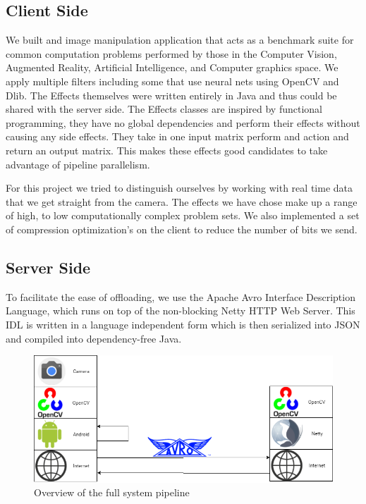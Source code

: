 \documentclass{sig-alternate}
\begin{document}
\subsection{Client Side}
We built and image manipulation application that  acts as a benchmark suite for common computation problems performed by those in the Computer Vision, Augmented Reality, Artificial Intelligence, and Computer graphics space. We apply multiple filters including some that use neural nets using  OpenCV and Dlib. The Effects themselves were written entirely in Java and thus could be shared with the server side. The Effects classes are inspired by functional programming, they have no global dependencies  and perform their effects without causing any side effects. They take in one input matrix perform and action and return an output matrix. This  makes these effects good candidates to take advantage of pipeline parallelism.

For this project we tried to distinguish ourselves by working with real time data that we get straight from the camera. The effects we have chose make up a range of high, to low computationally complex problem sets. We also implemented a set of  compression optimization's on the client to reduce  the number of bits we send.
    
\subsection{Server Side}
To facilitate the ease of offloading, we use the Apache Avro Interface Description Language, which runs on top of the non-blocking Netty HTTP Web Server.  This IDL is written in a language independent form which is then serialized into JSON and compiled into dependency-free Java.

\begin{figure}[h]
\noindent \includegraphics[scale=.3]{ServerOverview.png}
\caption{Overview of the full system pipeline}
\end{figure}
\end{document}
